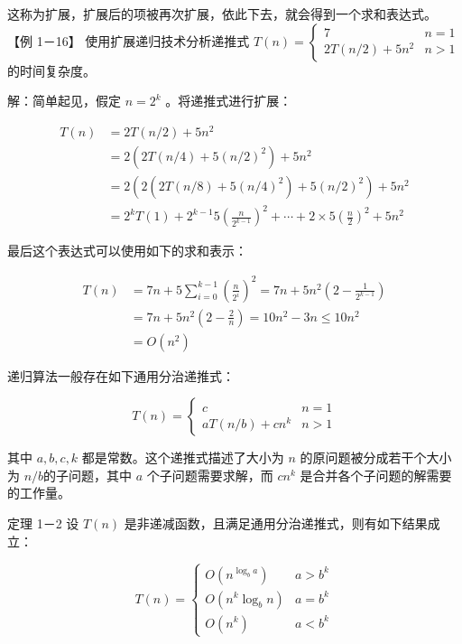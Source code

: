 \documentclass[10pt]{article}
\begin{document}
这称为扩展，扩展后的项被再次扩展，依此下去，就会得到一个求和表达式。\\
【例 1－16】 使用扩展递归技术分析递推式 $T(n)=\left\{\begin{array}{ll}7 & n=1 \\ 2 T(n / 2)+5 n^{2} & n>1\end{array}\right.$ 的时间复杂度。

解：简单起见，假定 $n=2^{k}$ 。将递推式进行扩展：

$$
\begin{aligned}
T(n) & =2 T(n / 2)+5 n^{2} \\
& =2\left(2 T(n / 4)+5(n / 2)^{2}\right)+5 n^{2} \\
& =2\left(2\left(2 T(n / 8)+5(n / 4)^{2}\right)+5(n / 2)^{2}\right)+5 n^{2} \\
& =2^{k} T(1)+2^{k-1} 5\left(\frac{n}{2^{k-1}}\right)^{2}+\cdots+2 \times 5\left(\frac{n}{2}\right)^{2}+5 n^{2}
\end{aligned}
$$

最后这个表达式可以使用如下的求和表示：

$$
\begin{aligned}
T(n) & =7 n+5 \sum_{i=0}^{k-1}\left(\frac{n}{2^{i}}\right)^{2}=7 n+5 n^{2}\left(2-\frac{1}{2^{k-1}}\right) \\
& =7 n+5 n^{2}\left(2-\frac{2}{n}\right)=10 n^{2}-3 n \leqslant 10 n^{2} \\
& =O\left(n^{2}\right)
\end{aligned}
$$

递归算法一般存在如下通用分治递推式：

\[
T(n)=\left\{\begin{array}{cc}
c & n=1  \tag{1-1}\\
a T(n / b)+c n^{k} & n>1
\end{array}\right.
\]

其中 $a, b, c, k$ 都是常数。这个递推式描述了大小为 $n$ 的原问题被分成若干个大小为 $n / b$的子问题，其中 $a$ 个子问题需要求解，而 $c n^{k}$ 是合并各个子问题的解需要的工作量。

定理 1－2 设 $T(n)$ 是非递减函数，且满足通用分治递推式，则有如下结果成立：

$$
T(n)= \begin{cases}O\left(n^{\log _{b} a}\right) & a>b^{k} \\ O\left(n^{k} \log _{b} n\right) & a=b^{k} \\ O\left(n^{k}\right) & a<b^{k}\end{cases}
$$
\end{document}
